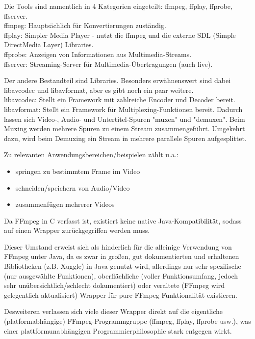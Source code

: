 Die Tools sind namentlich in 4 Kategorien eingeteilt: ffmpeg, ffplay, ffprobe, ffserver.\\
ffmpeg: Hauptsächlich für Konvertierungen zuständig.\\
ffplay: Simpler Media Player - nutzt die ffmpeg und die externe SDL (Simple DirectMedia Layer) Libraries.\\
ffprobe: Anzeigen von Informationen aus Multimedia-Streams.\\
ffserver: Streaming-Server für Multimedia-Übertragungen (auch live).

Der andere Bestandteil sind Libraries. Besonders erwähnenswert sind dabei libavcodec und libavformat, aber es gibt noch ein paar weitere.\\
libavcodec: Stellt ein Framework mit zahlreiche Encoder und Decoder bereit.\\
libavformat: Stellt ein Framework für Multiplexing-Funktionen bereit. Dadurch lassen sich Video-, Audio- und Untertitel-Spuren "muxen" und "demuxen". Beim Muxing werden mehrere Spuren zu einem Stream zusammengeführt. Umgekehrt dazu, wird beim Demuxing ein Stream in mehrere parallele Spuren aufgesplittet.


Zu relevanten Anwendungsbereichen/beispielen zählt u.a.:
\begin{itemize}
\item springen zu bestimmtem Frame im Video
\item schneiden/speichern von Audio/Video
\item zusammenfügen mehrerer Videos
\end{itemize}

Da FFmpeg in C verfasst ist, existiert keine native Java-Kompatibilität, sodass auf einen Wrapper zurückgegriffen werden muss.

Dieser Umstand erweist sich als hinderlich für die alleinige Verwendung von FFmpeg unter Java, da es zwar in großen, gut dokumentierten und erhaltenen Bibliotheken (z.B. Xuggle) in Java genutzt wird, allerdings nur sehr spezifische (nur ausgewählte Funktionen), oberflächliche (voller Funktionsumfang, jedoch sehr unübersichtlich/schlecht dokumentiert) oder veraltete (FFmpeg wird gelegentlich aktualisiert) Wrapper für pure FFmpeg-Funktionalität existieren.

Desweiteren verlassen sich viele dieser Wrapper direkt auf die eigentliche (platformabhängige) FFmpeg-Programmgruppe (ffmpeg, ffplay, ffprobe usw.), was einer plattformunabhängigen Programmierphilosophie stark entgegen wirkt.


